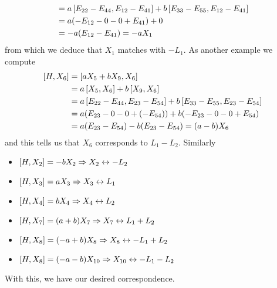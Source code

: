 \documentclass[12pt]{memoir}
\begin{document}
\begin{ptcbr}
\begin{align*}
        &=a\left\lbrack E_{22}-E_{44},E_{12}-E_{41}\right\rbrack+b\left\lbrack E_{33}-E_{55},E_{12}-E_{41}\right\rbrack\\
        &=a(-E_{12}-0-0+E_{41})+0\\
        &=-a(E_{12}-E_{41})=-aX_1
    \end{align*}
    from which we deduce that $X_1$ matches with $-L_1$. As another example we compute
    \begin{align*}
        \left\lbrack H,X_6\right\rbrack&=\left\lbrack aX_5+bX_9,X_6\right\rbrack\\
        &=a\left\lbrack X_5,X_6\right\rbrack+b\left\lbrack X_9,X_6\right\rbrack\\
        &=a\left\lbrack E_{22}-E_{44},E_{23}-E_{54}\right\rbrack+b\left\lbrack E_{33}-E_{55},E_{23}-E_{54}\right\rbrack\\
        &=a(E_{23}-0-0+(-E_{54}))+b(-E_{23}-0-0+E_{54})\\
        &=a(E_{23}-E_{54})-b(E_{23}-E_{54})=(a-b)X_6
    \end{align*}
    and this tells us that $X_6$ corresponds to $L_1-L_2$. Similarly
    \begin{itemize}
        \item $\left\lbrack H,X_2\right\rbrack=-bX_2\Rightarrow X_2\leftrightarrow-L_2$
        \item $\left\lbrack H,X_3\right\rbrack=aX_3\Rightarrow X_3\leftrightarrow L_1$
        \item $\left\lbrack H,X_4\right\rbrack=bX_4\Rightarrow X_4\leftrightarrow L_2$
        \item $\left\lbrack H,X_7\right\rbrack=(a+b)X_7\Rightarrow X_7\leftrightarrow L_1+L_2$
        \item $\left\lbrack H,X_8\right\rbrack=(-a+b)X_8\Rightarrow X_8\leftrightarrow -L_1+L_2$
        \item $\left\lbrack H,X_8\right\rbrack=(-a-b)X_{10}\Rightarrow X_{10}\leftrightarrow -L_1-L_2$
    \end{itemize}
    With this, we have our desired correspondence.
\end{ptcbr}
\end{document}
